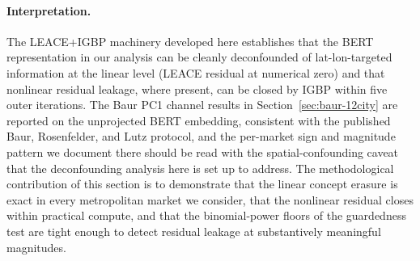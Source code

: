\paragraph{Interpretation.} The LEACE+IGBP machinery developed here
establishes that the BERT representation in our analysis can be
cleanly deconfounded of lat-lon-targeted information at the linear
level (LEACE residual at numerical zero) and that nonlinear
residual leakage, where present, can be closed by IGBP within five
outer iterations. The Baur PC1 channel results in
Section~\ref{sec:baur-12city} are reported on the unprojected
BERT embedding, consistent with the published Baur, Rosenfelder, and
Lutz protocol, and the per-market sign and magnitude pattern we
document there should be read with the spatial-confounding caveat
that the deconfounding analysis here is set up to address. The
methodological contribution of this section is to demonstrate that
the linear concept erasure is exact in every metropolitan market we
consider, that the nonlinear residual closes within practical
compute, and that the binomial-power floors of the guardedness test
are tight enough to detect residual leakage at substantively
meaningful magnitudes.

